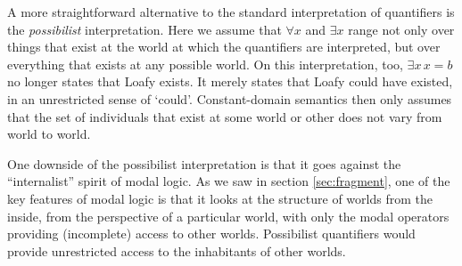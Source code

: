 


A more straightforward alternative to the standard interpretation of quantifiers
is the \emph{possibilist} interpretation. Here we assume that $\forall x$ and
$\exists x$ range not only over things that exist at the world at which the
quantifiers are interpreted, but over everything that exists at any possible
world. On this interpretation, too, $\exists x\, x\!=\!b$ no longer states that Loafy
exists. It merely states that Loafy could have existed, in an unrestricted sense
of `could'. Constant-domain semantics then only assumes that the set of
individuals that exist at some world or other does not vary from world to world.



One  downside of the possibilist interpretation is that it goes against the
``internalist'' spirit of modal logic. As we saw in section \ref{sec:fragment},
one of the key features of modal logic is that it looks at the structure of
worlds from the inside, from the perspective of a particular world, with only
the modal operators providing (incomplete) access to other worlds.  Possibilist
quantifiers would provide unrestricted access to the inhabitants of other
worlds.

